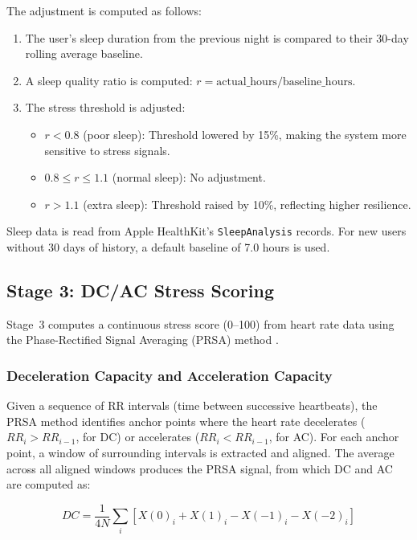\documentclass[12pt,letterpaper]{article}
\begin{document}
The adjustment is computed as follows:
\begin{enumerate}
    \item The user's sleep duration from the previous night is compared to their 30-day rolling average baseline.
    \item A sleep quality ratio is computed: $r = \text{actual\_hours} / \text{baseline\_hours}$.
    \item The stress threshold is adjusted:
    \begin{itemize}
        \item $r < 0.8$ (poor sleep): Threshold lowered by 15\%, making the system more sensitive to stress signals.
        \item $0.8 \leq r \leq 1.1$ (normal sleep): No adjustment.
        \item $r > 1.1$ (extra sleep): Threshold raised by 10\%, reflecting higher resilience.
    \end{itemize}
\end{enumerate}

Sleep data is read from Apple HealthKit's \texttt{SleepAnalysis} records. For new users without 30 days of history, a default baseline of 7.0 hours is used.

\subsection{Stage 3: DC/AC Stress Scoring}

Stage~3 computes a continuous stress score (0--100) from heart rate data using the Phase-Rectified Signal Averaging (PRSA) method \citep{bauer2006prsa}.

\subsubsection{Deceleration Capacity and Acceleration Capacity}

Given a sequence of RR intervals (time between successive heartbeats), the PRSA method identifies anchor points where the heart rate decelerates ($RR_i > RR_{i-1}$, for DC) or accelerates ($RR_i < RR_{i-1}$, for AC). For each anchor point, a window of surrounding intervals is extracted and aligned. The average across all aligned windows produces the PRSA signal, from which DC and AC are computed as:

\begin{equation}
    DC = \frac{1}{4N}\sum_{i} \left[ X(0)_i + X(1)_i - X(-1)_i - X(-2)_i \right]
\end{equation}
\end{document}
